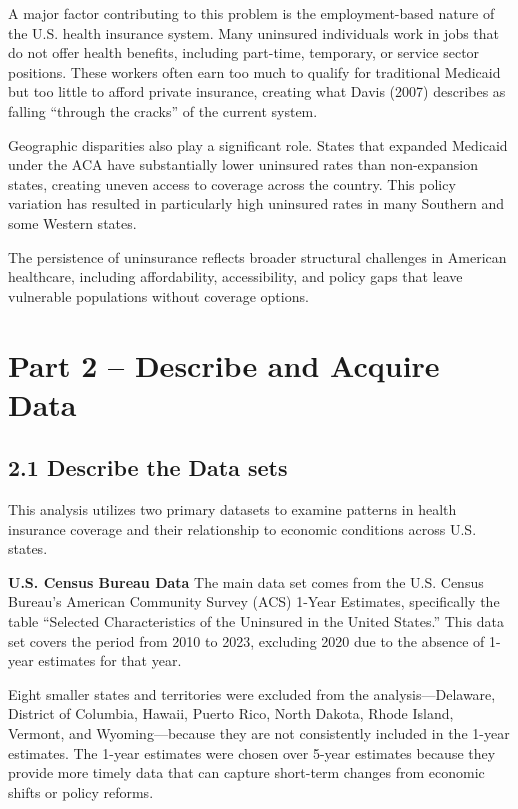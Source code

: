 \documentclass[
]{article}
\begin{document}
A major factor contributing to this problem is the employment-based
nature of the U.S. health insurance system. Many uninsured individuals
work in jobs that do not offer health benefits, including part-time,
temporary, or service sector positions. These workers often earn too
much to qualify for traditional Medicaid but too little to afford
private insurance, creating what Davis (2007) describes as falling
``through the cracks'' of the current system.

Geographic disparities also play a significant role. States that
expanded Medicaid under the ACA have substantially lower uninsured rates
than non-expansion states, creating uneven access to coverage across the
country. This policy variation has resulted in particularly high
uninsured rates in many Southern and some Western states.

The persistence of uninsurance reflects broader structural challenges in
American healthcare, including affordability, accessibility, and policy
gaps that leave vulnerable populations without coverage options.

\section{Part 2 -- Describe and Acquire
Data}\label{part-2-describe-and-acquire-data}

\subsection{2.1 Describe the Data sets}\label{describe-the-data-sets}

This analysis utilizes two primary datasets to examine patterns in
health insurance coverage and their relationship to economic conditions
across U.S. states.

\textbf{U.S. Census Bureau Data} The main data set comes from the U.S.
Census Bureau's American Community Survey (ACS) 1-Year Estimates,
specifically the table ``Selected Characteristics of the Uninsured in
the United States.'' This data set covers the period from 2010 to 2023,
excluding 2020 due to the absence of 1-year estimates for that year.

Eight smaller states and territories were excluded from the
analysis---Delaware, District of Columbia, Hawaii, Puerto Rico, North
Dakota, Rhode Island, Vermont, and Wyoming---because they are not
consistently included in the 1-year estimates. The 1-year estimates were
chosen over 5-year estimates because they provide more timely data that
can capture short-term changes from economic shifts or policy reforms.
\end{document}
